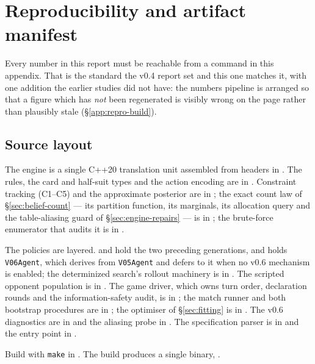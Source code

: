 \section{Reproducibility and artifact manifest}
\label{app:repro}

Every number in this report must be reachable from a command in this appendix.
That is the standard the v0.4 report set and this one matches it, with one
addition the earlier studies did not have: the numbers pipeline is arranged so
that a figure which has \emph{not} been regenerated is visibly wrong on the page
rather than plausibly stale (\S\ref{app:repro-build}).

\subsection{Source layout}
\label{app:repro-source}

The engine is a single C++20 translation unit assembled from headers in
. The rules, the card and half-suit types and the action
encoding are in . Constraint tracking (C1--C5) and
the approximate posterior are in ; the exact
count law of \S\ref{sec:belief-count} --- its partition function, its marginals,
its allocation query and the table-aliasing guard of
\S\ref{sec:engine-repairs} --- is in ; the
brute-force enumerator that audits it is in .

The policies are layered.  and
 hold the two preceding generations, and
 holds \texttt{V06Agent}, which derives from
\texttt{V05Agent} and defers to it when no v0.6 mechanism is enabled; the
determinized search's rollout machinery is in
. The scripted opponent population is in
. The game driver, which owns turn order,
declaration rounds and the information-safety audit, is in
; the match runner and both bootstrap procedures
are in ; the optimiser of \S\ref{sec:fitting} is
in . The v0.6 diagnostics are in
 and the aliasing probe in
. The specification parser is in
 and the entry point in
.

Build with \verb|make| in . The build produces a single binary,
.

